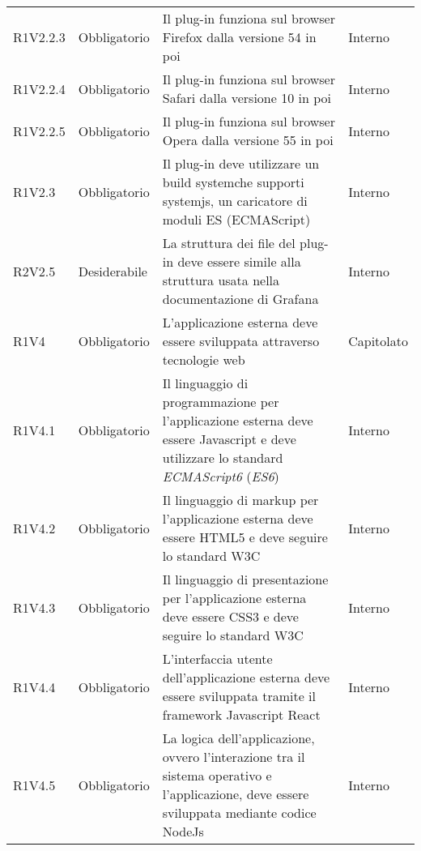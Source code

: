 \begin{longtable} {
		>{\centering}p{18mm} 
		>{\centering}p{28mm}
		>{}p{50mm} 
		>{}p{28mm}
		}
	R1V2.2.3 & 
	Obbligatorio & 
	Il plug-in funziona sul browser Firefox dalla versione 54 in poi &
	Interno  \TBstrut \\ [2mm]
	
	R1V2.2.4 & 
	Obbligatorio & 
	Il plug-in funziona sul browser Safari dalla versione 10 in poi &
	Interno  \TBstrut \\ [2mm]
	
	R1V2.2.5 & 
	Obbligatorio & 
	Il plug-in funziona sul browser Opera dalla versione 55 in poi &
	Interno  \TBstrut \\ [2mm]
	
	R1V2.3 & 
	Obbligatorio & 
	Il plug-in deve utilizzare un build system\glosp che supporti systemjs, un caricatore di moduli ES (ECMAScript) &
	Interno  \TBstrut \\ [2mm]
	
	R2V2.5 &
	Desiderabile &
	La struttura dei file del plug-in deve essere simile alla struttura usata nella documentazione di Grafana\glo &
	Interno  \TBstrut \\ [2mm]
	
	R1V4 & 
	Obbligatorio & 
	L'applicazione esterna deve essere sviluppata attraverso tecnologie web &
	Capitolato \TBstrut \\ [2mm]
	
	R1V4.1 & 
	Obbligatorio & 
	Il linguaggio di programmazione per l'applicazione esterna deve essere Javascript e deve utilizzare lo standard \textit{ECMAScript6} (\textit{ES6}) &
	Interno  \TBstrut \\ [2mm]
	
	R1V4.2 & 
	Obbligatorio & 
	Il linguaggio di markup per l'applicazione esterna deve essere HTML5 e deve seguire lo standard W3C &
	Interno  \TBstrut \\ [2mm]
	
	R1V4.3 & 
	Obbligatorio & 
	Il linguaggio di presentazione per l'applicazione esterna deve essere CSS3 e deve seguire lo standard W3C &
	Interno  \TBstrut \\ [2mm]

	R1V4.4 & 
	Obbligatorio & 
	L'interfaccia utente dell'applicazione esterna deve essere sviluppata tramite il framework Javascript React &
	Interno  \TBstrut \\ [2mm]

	R1V4.5 & 
	Obbligatorio & 
	La logica dell'applicazione, ovvero l'interazione tra il sistema operativo e l'applicazione, deve essere sviluppata mediante codice NodeJs &
	Interno  \TBstrut \\ [2mm]


\end{longtable}

